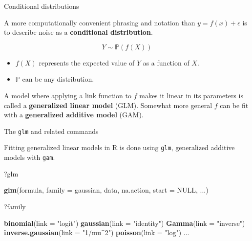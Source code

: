 \documentclass[
  ignorenonframetext,
]{beamer}
\newenvironment{Shaded}{\begin{snugshade}}{\end{snugshade}}
\newcommand{\DataTypeTok}[1]{\textcolor[rgb]{0.13,0.29,0.53}{#1}}
\newcommand{\KeywordTok}[1]{\textcolor[rgb]{0.13,0.29,0.53}{\textbf{#1}}}
\newcommand{\NormalTok}[1]{#1}
\newcommand{\OtherTok}[1]{\textcolor[rgb]{0.56,0.35,0.01}{#1}}
\newcommand{\StringTok}[1]{\textcolor[rgb]{0.31,0.60,0.02}{#1}}
\providecommand{\tightlist}{%
  \setlength{\itemsep}{0pt}\setlength{\parskip}{0pt}}
\begin{document}
\begin{frame}{Conditional distributions}
\protect\hypertarget{conditional-distributions}{}

A more computationally convenient phrasing and notation than
\(y=f(x)+\epsilon\) is to describe noise as a \textbf{conditional
distribution}.

\[
Y\sim \mathbb{P}(f(X))
\]

\begin{itemize}
\tightlist
\item
  \(f(X)\) represents the expected value of \(Y\) as a function of
  \(X\).
\item
  \(\mathbb{P}\) can be any distribution.
\end{itemize}

A model where applying a link function to \(f\) makes it linear in its
parameters is called a \textbf{generalized linear model} (GLM). Somewhat
more general \(f\) can be fit with a \textbf{generalized additive model}
(GAM).

\end{frame}

\begin{frame}[fragile]{The \texttt{glm} and related commands}
\protect\hypertarget{the-glm-and-related-commands}{}

Fitting generalized linear models in R is done using \texttt{glm},
generalized additive models with \texttt{gam}.

\begin{Shaded}
\begin{Highlighting}[]
\NormalTok{?glm}

\KeywordTok{glm}\NormalTok{(formula, }\DataTypeTok{family =}\NormalTok{ gaussian, data,}
\NormalTok{    na.action, }\DataTypeTok{start =} \OtherTok{NULL}\NormalTok{, ...)}

\NormalTok{?family}

\KeywordTok{binomial}\NormalTok{(}\DataTypeTok{link =} \StringTok{"logit"}\NormalTok{)}
\KeywordTok{gaussian}\NormalTok{(}\DataTypeTok{link =} \StringTok{"identity"}\NormalTok{)}
\KeywordTok{Gamma}\NormalTok{(}\DataTypeTok{link =} \StringTok{"inverse"}\NormalTok{)}
\KeywordTok{inverse.gaussian}\NormalTok{(}\DataTypeTok{link =} \StringTok{"1/mu^2"}\NormalTok{)}
\KeywordTok{poisson}\NormalTok{(}\DataTypeTok{link =} \StringTok{"log"}\NormalTok{)}
\NormalTok{...}
\end{Highlighting}
\end{Shaded}

\end{frame}
\end{document}
